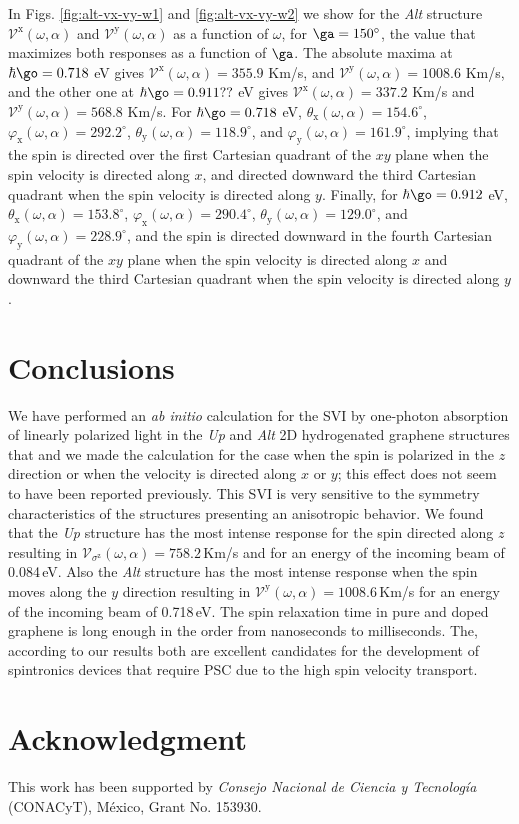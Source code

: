\documentclass[prb,11pt,tightenlines,twocolumn,aps]{revtex4-1}
\begin{document}
In Figs. \ref{fig:alt-vx-vy-w1} and \ref{fig:alt-vx-vy-w2} we show  for the
\emph{Alt} structure $\mathcal{V}^{\mathrm{x}} (\omega,\alpha)$ and
$\mathcal{V}^{\mathrm{y}} (\omega,\alpha)$ as a function of $\omega$, for
$\ga=150^\circ$, the value that maximizes both responses as a function of
$\ga$.
% 
The absolute maxima at $\hbar\go=0.718$ eV gives
% 
$\mathcal{V}^{\mathrm{x}} (\omega,\alpha) =  355.9$ Km/s, and 
$\mathcal{V}^{\mathrm{y}} (\omega,\alpha) = 1008.6$ Km/s, 
% 
and the other one at $\hbar\go=0.911??$ eV gives
% 
$\mathcal{V}^{\mathrm{x}} (\omega,\alpha) = 337.2$ Km/s and
$\mathcal{V}^{\mathrm{y}} (\omega,\alpha) = 568.8$ Km/s.
% 
For $\hbar\go=0.718$ eV,
$\theta_{\mathrm{x}} (\omega,\alpha) = 154.6^{\circ}$, 
$\varphi_{\mathrm{x}}(\omega,\alpha) = 292.2^{\circ}$, 
% 
$\theta_{\mathrm{y}} (\omega,\alpha) = 118.9^{\circ}$, and 
$\varphi_{\mathrm{y}}(\omega,\alpha) = 161.9^{\circ}$, 
% 
implying that the spin is directed over the first Cartesian quadrant of the
$xy$ plane when the spin velocity is directed along $x$, and directed downward
the third Cartesian quadrant when the spin velocity is directed along $y$.
% 
Finally, for $\hbar\go=0.912$ eV, 
% 
$\theta_{\mathrm{x}}(\omega,\alpha) = 153.8^{\circ}$, 
$\varphi_{\mathrm{x}} (\omega,\alpha) = 290.4^{\circ}$,
$\theta_{\mathrm{y}} (\omega,\alpha) = 129.0^{\circ}$, and
$\varphi_{\mathrm{y}} (\omega,\alpha) =228.9^{\circ}$, 
% 
and the spin is directed downward in the fourth Cartesian quadrant of the $xy$
plane when the spin velocity is directed along $x$ and downward the third
Cartesian quadrant when the spin velocity is directed along $y$.

\section{Conclusions} %
\label{sec:conclusions}

We have performed an \emph{ab initio} calculation for the SVI by one-photon
absorption of linearly polarized light in the \emph{Up} and \emph{Alt} 2D
hydrogenated graphene structures that and we made the calculation for the case
when the spin is polarized in the $z$ direction or when the velocity is
directed along $x$ or $y$; this effect does not seem to have been reported
previously. 
% 
This SVI is very sensitive to the symmetry characteristics of the structures
presenting an anisotropic behavior. We found that the \emph{Up} structure has
the most intense response for the spin directed along $z$ resulting in 
% 
$\mathcal{V}_{\sigma^{\mathrm{z}}} (\omega,\alpha) = 758.2$\,Km/s and 
% 
for an energy of the incoming beam of 0.084\,eV. Also the \emph{Alt} structure
has the most intense response when the spin moves along the $y$ direction
resulting in 
% 
$\mathcal{V}^{\mathrm{y}} (\omega,\alpha) = 1008.6$\,Km/s
% 
for an energy of the incoming beam of 0.718\,eV.
% 
The spin relaxation time in pure and doped graphene is long enough in the order
from nanoseconds to milliseconds. \cite{wojtaszekPRB13,ertlerPRB09} The,
according to our results both are excellent candidates for the development of
spintronics devices that require PSC due to the high spin velocity transport.

\section{Acknowledgment} %

This work has been supported by \emph{Consejo Nacional de Ciencia y
Tecnolog\'ia} (CONACyT), M\'exico, Grant No. 153930.


\end{document}
